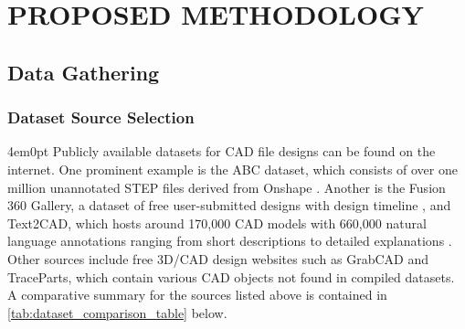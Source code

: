 \renewcommand{\thechapter}{\Roman{chapter}}
\chapter{PROPOSED METHODOLOGY}
\renewcommand{\thechapter}{\arabic{chapter}}

\section{Data Gathering}

\subsection{Dataset Source Selection}
	\begin{indentedblock}{4em}{0pt}
		Publicly available datasets for CAD file designs can be found on the internet. One prominent example is the ABC dataset, which consists of over one million unannotated STEP files derived from Onshape \parencite{abc_dataset_koch}. Another is the Fusion 360 Gallery, a dataset of free user-submitted designs with design timeline \parencite{fusion_dataset_willis}, and Text2CAD, which hosts around 170,000 CAD models with 660,000 natural language annotations ranging from short descriptions to detailed explanations \parencite{text2cad_mohammad}. Other sources include free 3D/CAD design websites such as GrabCAD and TraceParts, which contain various CAD objects not found in compiled datasets. A comparative summary for the sources listed above is contained in \autoref{tab:dataset_comparison_table} below.
		
		

\end{indentedblock}
